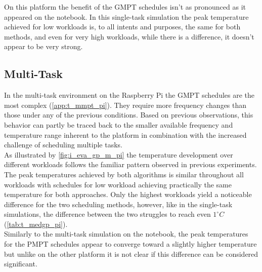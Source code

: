 \hspace*{0.5ex}\hspace{0.5ex} On this platform the benefit of the GMPT schedules isn't as pronounced as it appeared on the notebook. In this single-task simulation the peak temperature achieved for low workloads is, to all intents and purposes, the same for both methods, and even for very high workloads, while there is a difference, it doesn't appear to be very strong.

\subsection{Multi-Task}
In the multi-task environment on the Raspberry Pi the GMPT schedules are the most complex (\autoref{app:t_mmpt_pi}). They require more frequency changes than those under any of the previous conditions. Based on previous observations, this behavior can partly be traced back to the smaller available frequency and temperature range inherent to the platform in combination with the increased challenge of scheduling multiple tasks.\\
\hspace*{0.5ex}\hspace{0.5ex} As illustrated by \autoref{fig:i_eva_gp_m_pi} the temperature development over different workloads follows the familiar pattern observed in previous experiments. The peak temperatures achieved by both algorithms is similar throughout all workloads with schedules for low workload achieving practically the same temperature for both approaches. Only the highest workloads yield a noticeable difference for the two scheduling methods, however, like in the single-task simulations, the difference between the two struggles to reach even $1^\circ C$ (\autoref{tab:t_medgp_pi}).\\
\hspace*{0.5ex}\hspace{0.5ex} Similarly to the multi-task simulation on the notebook, the peak temperatures for the PMPT schedules appear to converge toward a slightly higher temperature but unlike on the other platform it is not clear if this difference can be considered significant.\\

\begin{table}[H]
 \centering
 \caption[Multi-Task median results Raspberry]{Median peak temperature for all workloads and their performance gap}\label{tab:t_medgp_pi}
 \setlength\tabcolsep{5pt}
\end{table}
